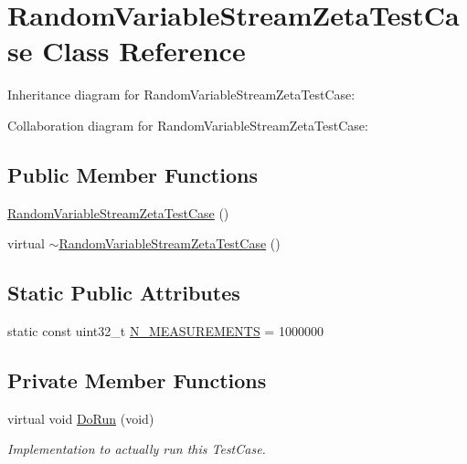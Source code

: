 \hypertarget{classRandomVariableStreamZetaTestCase}{}\section{Random\+Variable\+Stream\+Zeta\+Test\+Case Class Reference}
\label{classRandomVariableStreamZetaTestCase}


Inheritance diagram for Random\+Variable\+Stream\+Zeta\+Test\+Case\+:


Collaboration diagram for Random\+Variable\+Stream\+Zeta\+Test\+Case\+:
\subsection*{Public Member Functions}
\begin{DoxyCompactItemize}
\item 
\hyperlink{classRandomVariableStreamZetaTestCase_af585aff7a5f664330749d95189b90efe}{Random\+Variable\+Stream\+Zeta\+Test\+Case} ()
\item 
virtual \hyperlink{classRandomVariableStreamZetaTestCase_a6454005fa7cc224a25be77c36cb4d165}{$\sim$\+Random\+Variable\+Stream\+Zeta\+Test\+Case} ()
\end{DoxyCompactItemize}
\subsection*{Static Public Attributes}
\begin{DoxyCompactItemize}
\item 
static const uint32\+\_\+t \hyperlink{classRandomVariableStreamZetaTestCase_a40f8e66ab80fb024916ce61573e37b41}{N\+\_\+\+M\+E\+A\+S\+U\+R\+E\+M\+E\+N\+TS} = 1000000
\end{DoxyCompactItemize}
\subsection*{Private Member Functions}
\begin{DoxyCompactItemize}
\item 
virtual void \hyperlink{classRandomVariableStreamZetaTestCase_a7618faf8620a51f1ed56e1c7e10f3d1f}{Do\+Run} (void)
\begin{DoxyCompactList}\small\item\em Implementation to actually run this Test\+Case. \end{DoxyCompactList}\end{DoxyCompactItemize}
